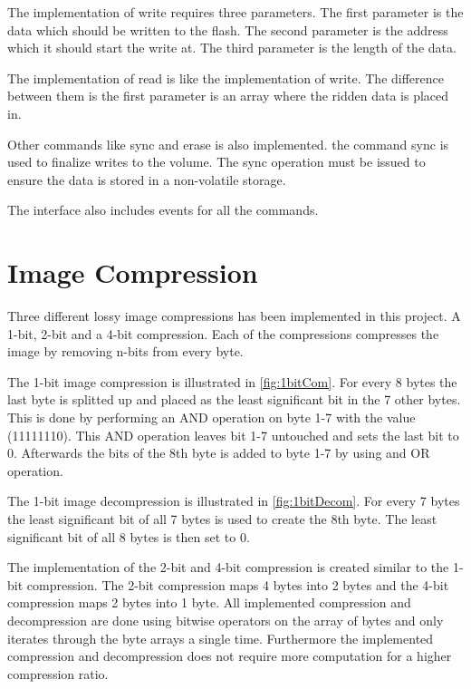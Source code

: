 The implementation of write requires three parameters. The first parameter is the data which should be written to the flash. The second parameter is the address which it should start the write at. The third parameter is the length of the data. 

The implementation of read is like the implementation of write. The difference between them is the first parameter is an array where the ridden data is placed in. 

Other commands like sync and erase is also implemented. the command sync is used to finalize writes to the volume. The sync operation must be issued to ensure the data is stored in a non-volatile storage. 

The interface also includes events for all the commands. 

\section{Image Compression}
Three different lossy image compressions has been implemented in this project. A 1-bit, 2-bit and a 4-bit compression. Each of the compressions compresses the image by removing n-bits from every byte. 

The 1-bit image compression is illustrated in \ref{fig:1bitCom}. For every 8 bytes the last byte is splitted up and placed as the least significant bit in the 7 other bytes. This is done by performing an AND operation on byte 1-7 with the value (11111110). This AND operation leaves bit 1-7 untouched and sets the last bit to 0.  Afterwards the bits of the 8th byte is added to byte 1-7 by using and OR operation.


The 1-bit image decompression is illustrated in \ref{fig:1bitDecom}. For every 7 bytes the least significant bit of all 7 bytes is used to create the 8th byte. The least significant bit of all 8 bytes is then set to 0.



The implementation of the 2-bit and 4-bit compression is created similar to the 1-bit compression. The 2-bit compression maps 4 bytes into 2 bytes and the 4-bit compression maps 2 bytes into 1 byte.
\FloatBarrier
All implemented compression and decompression are done using bitwise operators on the array of bytes and only iterates through the byte arrays a single time. Furthermore the implemented compression and decompression does not require more computation for a higher compression ratio.


